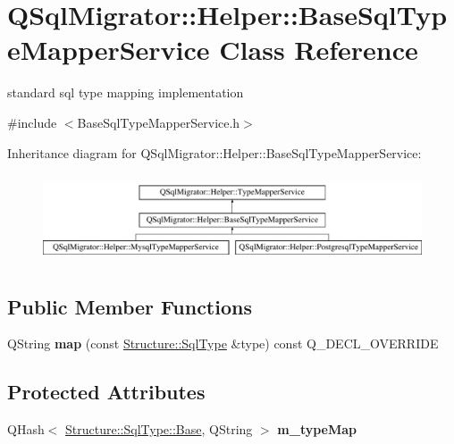 \hypertarget{class_q_sql_migrator_1_1_helper_1_1_base_sql_type_mapper_service}{}\section{Q\+Sql\+Migrator\+:\+:Helper\+:\+:Base\+Sql\+Type\+Mapper\+Service Class Reference}
\label{class_q_sql_migrator_1_1_helper_1_1_base_sql_type_mapper_service}


standard sql type mapping implementation  




{\ttfamily \#include $<$Base\+Sql\+Type\+Mapper\+Service.\+h$>$}

Inheritance diagram for Q\+Sql\+Migrator\+:\+:Helper\+:\+:Base\+Sql\+Type\+Mapper\+Service\+:\begin{figure}[H]
\begin{center}
\leavevmode
\includegraphics[height=2.633229cm]{class_q_sql_migrator_1_1_helper_1_1_base_sql_type_mapper_service}
\end{center}
\end{figure}
\subsection*{Public Member Functions}
\begin{DoxyCompactItemize}
\item 
\mbox{\label{class_q_sql_migrator_1_1_helper_1_1_base_sql_type_mapper_service_a0fe8a469f062155edb1199e1c4e742d8}} 
Q\+String {\bfseries map} (const \hyperlink{class_q_sql_migrator_1_1_structure_1_1_sql_type}{Structure\+::\+Sql\+Type} \&type) const Q\+\_\+\+D\+E\+C\+L\+\_\+\+O\+V\+E\+R\+R\+I\+DE
\end{DoxyCompactItemize}
\subsection*{Protected Attributes}
\begin{DoxyCompactItemize}
\item 
\mbox{\label{class_q_sql_migrator_1_1_helper_1_1_base_sql_type_mapper_service_a0896a6b1fca59b9075ba6cab5bbf4ec5}} 
Q\+Hash$<$ \hyperlink{class_q_sql_migrator_1_1_structure_1_1_sql_type_ac1733fcbed79941acd89bcf3196d9912}{Structure\+::\+Sql\+Type\+::\+Base}, Q\+String $>$ {\bfseries m\+\_\+type\+Map}
\end{DoxyCompactItemize}


